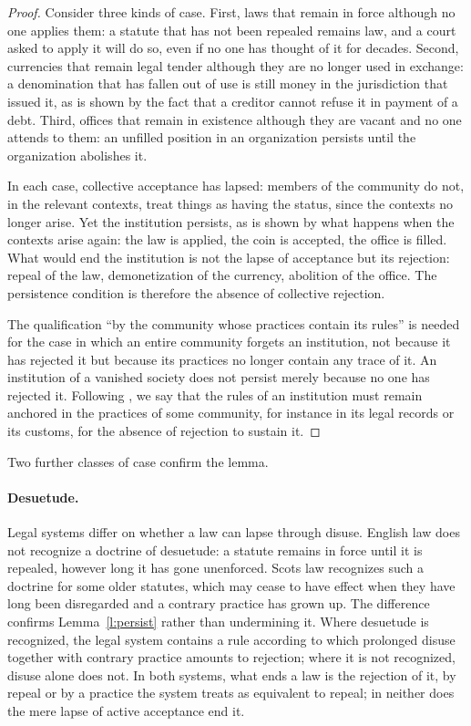 \documentclass{situationist-preprint}
\begin{document}
\begin{proof}
Consider three kinds of case. First, laws that remain in force although no one applies them: a statute that has not been repealed remains law, and a court asked to apply it will do so, even if no one has thought of it for decades. Second, currencies that remain legal tender although they are no longer used in exchange: a denomination that has fallen out of use is still money in the jurisdiction that issued it, as is shown by the fact that a creditor cannot refuse it in payment of a debt. Third, offices that remain in existence although they are vacant and no one attends to them: an unfilled position in an organization persists until the organization abolishes it.

In each case, collective acceptance has lapsed: members of the community do not, in the relevant contexts, treat things as having the status, since the contexts no longer arise. Yet the institution persists, as is shown by what happens when the contexts arise again: the law is applied, the coin is accepted, the office is filled. What would end the institution is not the lapse of acceptance but its rejection: repeal of the law, demonetization of the currency, abolition of the office. The persistence condition is therefore the absence of collective rejection.

The qualification \enquote{by the community whose practices contain its rules} is needed for the case in which an entire community forgets an institution, not because it has rejected it but because its practices no longer contain any trace of it. An institution of a vanished society does not persist merely because no one has rejected it. Following \citet{Epstein2015}, we say that the rules of an institution must remain anchored in the practices of some community, for instance in its legal records or its customs, for the absence of rejection to sustain it.
\end{proof}

Two further classes of case confirm the lemma.

\paragraph{Desuetude.} Legal systems differ on whether a law can lapse through disuse. English law does not recognize a doctrine of desuetude: a statute remains in force until it is repealed, however long it has gone unenforced. Scots law recognizes such a doctrine for some older statutes, which may cease to have effect when they have long been disregarded and a contrary practice has grown up. The difference confirms Lemma~\ref{l:persist} rather than undermining it. Where desuetude is recognized, the legal system contains a rule according to which prolonged disuse together with contrary practice amounts to rejection; where it is not recognized, disuse alone does not. In both systems, what ends a law is the rejection of it, by repeal or by a practice the system treats as equivalent to repeal; in neither does the mere lapse of active acceptance end it.
\end{document}
